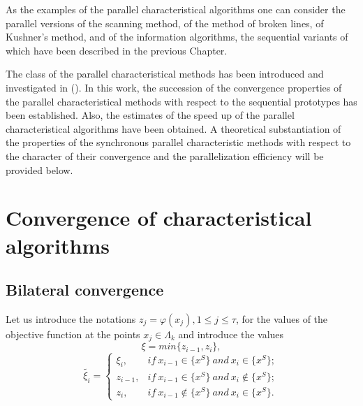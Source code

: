 As the examples of the parallel characteristical algorithms one can consider the parallel versions of the scanning method, of the  method of broken lines, of Kushner’s method, and of the information algorithms, the sequential variants of which have been described in the previous Chapter.

The class of the parallel characteristical methods has been introduced and investigated in (\cite{3_GrishaginSergeyevStrongin}). In this work, the succession of the convergence properties of the parallel characteristical methods with respect to the sequential prototypes has been established. Also, the estimates of the speed up of the parallel characteristical algorithms have been obtained. A theoretical substantiation of the properties of the synchronous parallel characteristic methods with respect to the character of their convergence and the parallelization efficiency will be provided below. 

\section{Convergence of characteristical algorithms}
\label{sec:3_2}
\subsection{Bilateral convergence}
Let us introduce the notations $z_j = \varphi(x_j), 1 \le j \le \tau$, for the values of the objective function at the points $x_j \in \Lambda_k$ and introduce the values
\begin{equation*}
\xi = min \{ z_{i-1}, z_i \},
\end{equation*}
\begin{equation*}
\tilde{\xi_i} = 
\begin{cases}
\xi_i, & if\  x_{i-1} \in \{x^S\}\  and\  x_i \in \{x^S\}; \\
z_{i-1},& if\  x_{i-1} \in \{x^S\}\  and \ x_i \notin \{x^S\}; \\
z_i, & if\  x_{i-1} \notin \{x^S\}\  and\  x_i \in \{x^S\}.
\end{cases}
\end{equation*}

